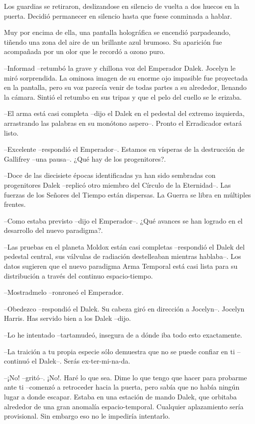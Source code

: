 Los guardias se retiraron, deslizandose en silencio de vuelta a dos huecos en la puerta. Decidió permanecer en silencio hasta que fuese conminada a hablar. 

Muy por encima de ella, una pantalla holográfica se encendió parpadeando, tiñendo una zona del aire de un brillante azul brumoso. Su aparición fue acompañada por un olor que le recordó a ozono puro. 

--Informad --retumbó la grave y chillona voz del Emperador Dalek. Jocelyn le miró sorprendida. La ominosa imagen de su enorme ojo impasible fue proyectada en la pantalla, pero su voz parecía venir de todas partes a su alrededor, llenando la cámara. Sintió el retumbo en sus tripas y que el pelo del cuello se le erizaba. 

--El arma está casi completa --dijo el Dalek en el pedestal del extremo izquierda, arrastrando las palabras en su monótono aspero--. Pronto el Erradicador estará listo. 

--Excelente --respondió el Emperador--. Estamos en vísperas de la destrucción de Gallifrey --una pausa--. ¿Qué hay de los progenitores?. 

--Doce de las diecisiete épocas identificadas ya han sido sembradas con progenitores Dalek --replicó otro miembro del Círculo de la Eternidad--. Las fuerzas de los Señores del Tiempo están dispersas. La Guerra se libra en múltiples frentes. 

--Como estaba previsto --dijo el Emperador--. ¿Qué avances se han logrado en el desarrollo del nuevo paradigma?. 

--Las pruebas en el planeta Moldox están casi completas --respondió el Dalek del pedestal central, sus válvulas de radiación destelleaban mientras hablaba--. Los datos sugieren que el nuevo paradigma Arma Temporal está casi lista para su distribución a través del continuo espacio-tiempo. 

--Mostradmelo --ronroneó el Emperador. 

--Obedezco --respondió el Dalek. Su cabeza giró en dirección a Jocelyn--. Jocelyn Harris. Has servido bien a los Dalek --dijo. 

--Lo he intentado --tartamudeó, insegura de a dónde iba todo esto exactamente. 

--La traición a tu propia especie sólo demuestra que no se puede confiar en ti --continuó el Dalek--. Serás ex-ter-mi-na-da. 

--¡No! --gritó--. ¡No!. Haré lo que sea. Dime lo que tengo que hacer para probarme ante ti --comenzó a retroceder hacia la puerta, pero sabía que no había ningún lugar a donde escapar. Estaba en una estación de mando Dalek, que orbitaba alrededor de una gran anomalía espacio-temporal. Cualquier aplazamiento sería provisional. Sin embargo eso no le impediría intentarlo. 

